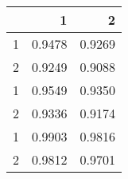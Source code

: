 \begin{tabular}{lrr}
\toprule
{} &       1 &       2 \\
\midrule
1 &  0.9478 &  0.9269 \\
2 &  0.9249 &  0.9088 \\
1 &  0.9549 &  0.9350 \\
2 &  0.9336 &  0.9174 \\
1 &  0.9903 &  0.9816 \\
2 &  0.9812 &  0.9701 \\
\bottomrule
\end{tabular}
